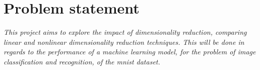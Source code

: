 \section{Problem statement}\label{sec:problem-statement}

\emph{This project aims to explore the impact of dimensionality reduction, comparing linear and nonlinear dimensionality reduction techniques. This will be done in regards to the performance of a machine learning model, for the problem of image classification and recognition, of the \gls{mnist} dataset.}








